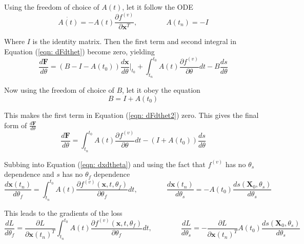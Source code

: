 \documentclass{article}
\theoremstyle{remark}
\theoremstyle{definition}
\begin{document}
Using the freedom of choice of $A(t)$, let it follow the ODE
\begin{equation}
    \dot{A(t)} = -A(t)\frac{\partial f^{(v)}}{\partial \mathbf{x}^{T}},
    \qquad
    \qquad
    A(t_{n}) = -I
\end{equation}

Where $I$ is the identity matrix. Then the first term and second integral in Equation (\ref{eqn: dFdthet}) become zero, yielding
\begin{equation}
\label{eqn: dFdthet2}
    \frac{d\mathbf{F}}{d\theta} = \left(
    B-I - A(t_{0})
    \right)\frac{d\mathbf{x}}{d\theta}\Biggr\vert_{t_{0}}
    +\int_{t_{n}}^{t_{0}}A(t)\frac{\partial f^{(v)}}{\partial \theta}dt
    -B\frac{ds}{d\theta}
\end{equation}

Now using the freedom of choice of $B$, let it obey the equation
\begin{equation}
    B = I +A(t_{0})
\end{equation}

This makes the first term in Equation (\ref{eqn: dFdthet2}) zero. This gives the final form of $\displaystyle  \frac{d\mathbf{F}}{d\theta}$
\begin{equation}
    \frac{d\mathbf{F}}{d\theta} = \int_{t_{n}}^{t_{0}}A(t)\frac{\partial f^{(v)}}{\partial \theta}dt - ( I + A(t_{0}))
    \frac{ds}{d\theta}
\end{equation}

Subbing into Equation (\ref{eqn: dxdtheta}) and using the fact that $f^{(v)}$ has no $\theta_{s}$ dependence and $s$ has no $\theta_{f}$ dependence
\begin{equation}
    \frac{d\mathbf{x}(t_{n})}{d\theta_{f}} = \int_{t_{n}}^{t_{0}} A(t)\frac{\partial f^{(v)}(\mathbf{x}, t, \theta_{f})}{\partial \theta_{f}}dt
    ,\qquad\qquad
    \frac{d\mathbf{x}(t_{n})}{d\theta_{s}} = -A(t_{0})\frac{ds(\mathbf{X}_{0}, \theta_{s})}{d\theta_{s}}
\end{equation}

This leads to the gradients of the loss
\begin{equation}
\label{eqn: dLdtheta2}
    \frac{dL}{d\theta_{f}} = \frac{\partial L}{\partial \mathbf{x}(t_{n})^{T}}\int_{t_{n}}^{t_{0}}
    A(t)\frac{\partial f^{(v)}(\mathbf{x}, t, \theta_{f})}{\partial\theta_{f}}dt
    ,\qquad\qquad
    \frac{dL}{d\theta_{s}} = -\frac{\partial L}{\partial \mathbf{x}(t_{n})^{T}}A(t_{0})
    \frac{ds(\mathbf{X}_{0}, \theta_{s})}{d\theta_{s}}
\end{equation}
\end{document}

